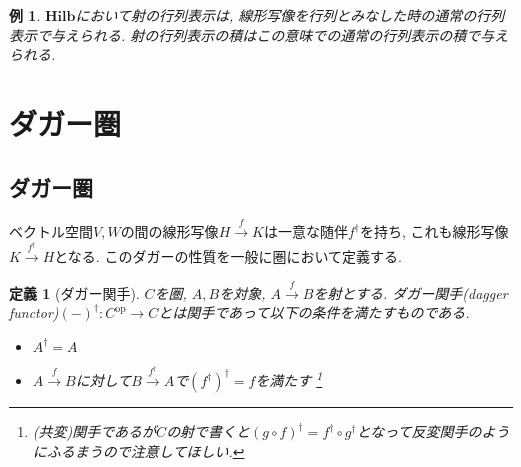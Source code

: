 \documentclass[a4paper,12pt]{ltjsarticle}
\theoremstyle{break}
\newtheorem{defn}[thm]{定義}
\newtheorem{thrm}[thm]{定理}
\newtheorem{eg}[thm]{例}
\newtheorem*{prf}{証明}
\newcommand{\hilb}{\mathbf{Hilb}}
\newcommand{\Hom}{\mathrm{Hom}}
\newcommand{\Op}{\mathrm{op}}
\newcommand{\xr}[1]{\xrightarrow{#1}}
\newcommand{\ci}{\circ}
\newcommand{\da}{\dagger}
\newcommand{\opl}{\oplus}
\numberwithin{equation}{section}
\begin{document}
\begin{eg}
  $\hilb$において射の行列表示は, 線形写像を行列とみなした時の通常の行列表示で与えられる. 
  射の行列表示の積はこの意味での通常の行列表示の積で与えられる. 
\end{eg}




\newpage

\section{ダガー圏}

\subsection{ダガー圏}

ベクトル空間$V,W$の間の線形写像$H \xr{f} K$は一意な随伴$f^\da$を持ち, これも線形写像$K \xr{f^\da} H$となる. 
このダガーの性質を一般に圏において定義する. 

\begin{defn}[ダガー関手]
  $C$を圏, $A,B$を対象, $A \xr{f} B$を射とする.  
  ダガー関手(dagger functor)$(-)^\da: C^{\Op} \to C$とは関手であって以下の条件を満たすものである. 
  \begin{itemize}
    \item $A^\da = A$
    \item $A \xr{f} B$に対して$B \xr{f^\da} A$で$(f^\da)^\da = f$を満たす
    \footnote{
      (共変)関手であるが$C$の射で書くと$(g \ci f)^\da = f^\da \ci g^\da$となって反変関手のようにふるまうので注意してほしい. 
    }
  \end{itemize}
\end{defn}
\end{document}
